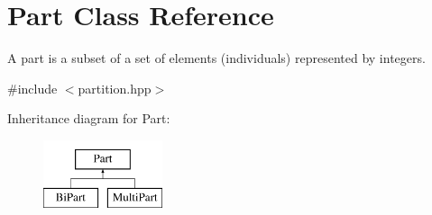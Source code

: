 \hypertarget{classPart}{\section{Part Class Reference}
\label{classPart}
}


A part is a subset of a set of elements (individuals) represented by integers.  




{\ttfamily \#include $<$partition.\-hpp$>$}

Inheritance diagram for Part\-:\begin{figure}[H]
\begin{center}
\leavevmode
\includegraphics[height=2.000000cm]{classPart}
\end{center}
\end{figure}
